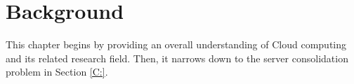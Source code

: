 \section{Background}

This chapter begins by providing an overall understanding of Cloud computing and its related research field.
Then, it narrows down to the server consolidation problem in Section \ref{C:}. 

